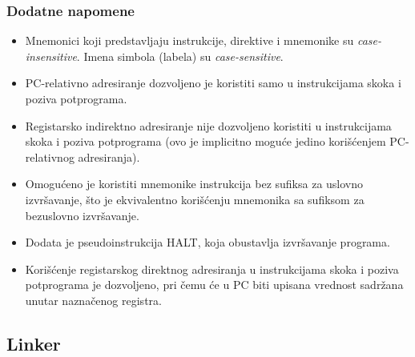 \subsubsection{Dodatne napomene}
\begin{itemize}
    \item Mnemonici koji predstavljaju instrukcije, direktive i mnemonike su
          \textit{case-insensitive}. Imena simbola (labela) su \textit{case-sensitive}.
    \item PC-relativno adresiranje dozvoljeno je koristiti samo u instrukcijama skoka
          i poziva potprograma.
    \item Registarsko indirektno adresiranje nije dozvoljeno koristiti u instrukci\-jama
          skoka i poziva potprograma (ovo je implicitno moguće jedino korišćenjem
          PC-relativnog adresiranja).
    \item Omogućeno je koristiti mnemonike instrukcija bez sufiksa za uslovno izvršavanje,
          što je ekvivalentno korišćenju mnemonika sa sufiksom za bezuslovno izvršavanje.
    \item Dodata je pseudoinstrukcija HALT, koja obustavlja izvršavanje pro\-grama.
    \item Korišćenje registarskog direktnog adresiranja u instrukcijama skoka i poziva
          potprograma je dozvoljeno, pri čemu će u PC biti upisana vrednost sadržana
          unutar naznačenog registra.
\end{itemize}

\subsection{Linker}

